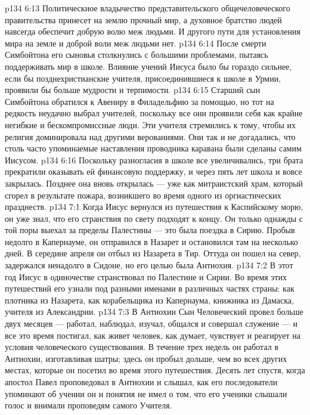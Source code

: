 \vs p134 6:13 Политическиое владычество представительского общечеловеческого правительства принесет на землю прочный мир, а духовное братство людей навсегда обеспечит добрую волю меж людьми. И другого пути для установления мира на земле и доброй воли меж людьми нет.
\separatorline
\vs p134 6:14 После смерти Симбойтона его сыновья столкнулись с большими проблемами, пытаясь поддерживать мир в школе. Влияние учений Иисуса было бы гораздо сильнее, если бы позднехристианские учителя, присоединившиеся к школе в Урмии, проявили бы больше мудрости и терпимости.
\vs p134 6:15 Старший сын Симбойтона обратился к Авениру в Филадельфию за помощью, но тот на редкость неудачно выбрал учителей, поскольку все они проявили себя как крайне негибкие и бескомпромиссные люди. Эти учителя стремились к тому, чтобы их религия доминировала над другими верованиями. Они так и не догадались, что столь часто упоминаемые наставления проводника каравана были сделаны самим Иисусом.
\vs p134 6:16 Поскольку разногласия в школе все увеличивались, три брата прекратили оказывать ей финансовую поддержку, и через пять лет школа и вовсе закрылась. Позднее она вновь открылась --- уже как митраистский храм, который сгорел в результате пожара, возникшего во время одного из оргиастических празднеств.
\vs p134 7:1 Когда Иисус вернулся из путешествия к Каспийскому морю, он уже знал, что его странствия по свету подходят к концу. Он только однажды с той поры выехал за пределы Палестины --- это была поездка в Сирию. Пробыв недолго в Капернауме, он отправился в Назарет и остановился там на несколько дней. В середине апреля он отбыл из Назарета в Тир. Оттуда он пошел на север, задержался ненадолго в Сидоне, но его целью была Антиохия.
\vs p134 7:2 В этот год Иисус в одиночестве странствовал по Палестине и Сирии. Во время этих путешествий его узнали под разными именами в различных частях страны: как плотника из Назарета, как корабельщика из Капернаума, книжника из Дамаска, учителя из Александрии.
\vs p134 7:3 В Антиохии Сын Человеческий провел больше двух месяцев --- работал, наблюдал, изучал, общался и совершал служение --- и все это время постигал, как живет человек, как думает, чувствует и реагирует на условия человеческого существования. В течение трех недель он работал в Антиохии, изготавливая шатры; здесь он пробыл дольше, чем во всех других местах, которые он посетил во время этого путешествия. Десять лет спустя, когда апостол Павел проповедовал в Антиохии и слышал, как его последователи упоминают об учении  он и понятия не имел о том, что его ученики слышали голос и внимали проповедям самого Учителя.
